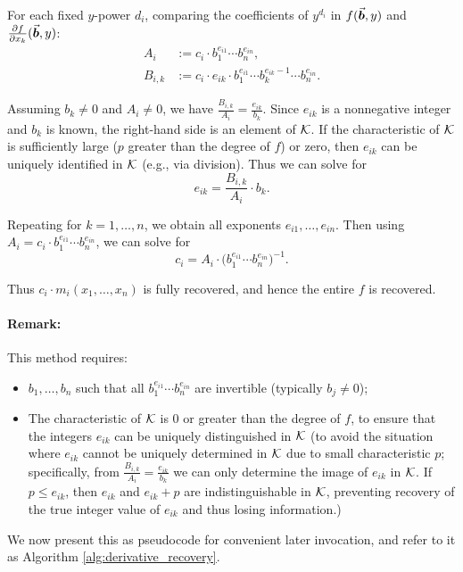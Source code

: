 \documentclass{article}
\numberwithin{equation}{section}
\begin{document}
For each fixed $y$-power $d_i$, comparing the coefficients of $y^{d_i}$ in $f(\vec{\boldsymbol{b}}, y)$ and $\frac{\partial f}{\partial x_k}(\vec{\boldsymbol{b}}, y)$:
\begin{align*}
A_i &:= c_i \cdot b_1^{e_{i1}} \cdots b_n^{e_{in}}, \\
B_{i,k} &:= c_i \cdot e_{ik} \cdot b_1^{e_{i1}} \cdots b_k^{e_{ik}-1} \cdots b_n^{e_{in}}.
\end{align*}

Assuming $b_k \neq 0$ and $A_i \neq 0$, we have
%
$\frac{B_{i,k}}{A_i} = \frac{e_{ik}}{b_k}.$
%
Since $e_{ik}$ is a nonnegative integer and $b_k$ is known, the right-hand side is an element of ${\mathcal{K}}$. If the characteristic of ${\mathcal{K}}$ is sufficiently large ($p$ greater than the degree of $f$) or zero, then $e_{ik}$ can be uniquely identified in ${\mathcal{K}}$ (e.g., via division). Thus we can solve for
\[
e_{ik} = \frac{B_{i,k}}{A_i} \cdot b_k.
\]

Repeating for $k=1,\dots,n$, we obtain all exponents $e_{i1},\dots,e_{in}$. Then using $A_i = c_i \cdot b_1^{e_{i1}} \cdots b_n^{e_{in}}$, we can solve for
\[
c_i = A_i \cdot \bigl( b_1^{e_{i1}} \cdots b_n^{e_{in}} \bigr)^{-1}.
\]

Thus $c_i \cdot m_i(x_1,\dots,x_n)$ is fully recovered, and hence the entire $f$ is recovered.

\paragraph{Remark:} This method requires:
\begin{itemize}
    \item $b_1,\dots,b_n$ such that all $b_1^{e_{i1}}\cdots b_n^{e_{in}}$ are invertible (typically $b_j \ne 0$);
    \item The characteristic of ${\mathcal{K}}$ is $0$ or greater than the degree of $f$, to ensure that the integers $e_{ik}$ can be uniquely distinguished in ${\mathcal{K}}$ (to avoid the situation where $e_{ik}$ cannot be uniquely determined in ${\mathcal{K}}$ due to small characteristic $p$; specifically, from $\frac{B_{i,k}}{A_i} = \frac{e_{ik}}{b_k}$ we can only determine the image of $e_{ik}$ in ${\mathcal{K}}$. If $p \le e_{ik}$, then $e_{ik}$ and $e_{ik}+p$ are indistinguishable in ${\mathcal{K}}$, preventing recovery of the true integer value of $e_{ik}$ and thus losing information.)
\end{itemize}

We now present this as pseudocode for convenient later invocation, and refer to it as Algorithm \ref{alg:derivative_recovery}.
\end{document}
